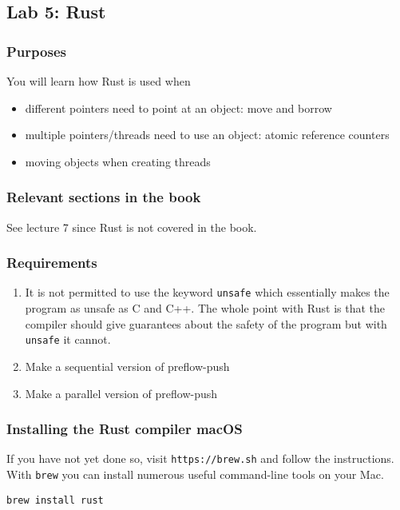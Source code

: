 \documentclass{forsete}
\begin{document}
{\begin{enumerate}
\end{enumerate}

\newpage
\subsection*{Lab 5: Rust}
\subsubsection*{Purposes}
You will learn how Rust is used when
\begin{itemize}
\item different pointers need to point at an object: move and borrow
\item multiple pointers/threads need to use an object: atomic reference counters
\item moving objects when creating threads
\end{itemize}

\subsubsection*{Relevant sections in the book}
See lecture 7 since Rust is not covered in the book.
\subsubsection*{Requirements}
\begin{enumerate}
\item It is not permitted to use the keyword \verb.unsafe. which essentially makes the program as unsafe as C and C++. The whole point with Rust is that the compiler should give guarantees about the safety of the program but with \verb.unsafe. it cannot.
\item Make a sequential version of preflow-push
\item Make a parallel version of preflow-push
\end{enumerate}

\subsubsection*{Installing the Rust compiler macOS}
If you have not yet done so, visit \verb!https://brew.sh! and follow the instructions. With \verb!brew! you 
can install numerous useful command-line tools on your Mac.
\begin{verbatim}
brew install rust
\end{verbatim}

}
\end{document}
